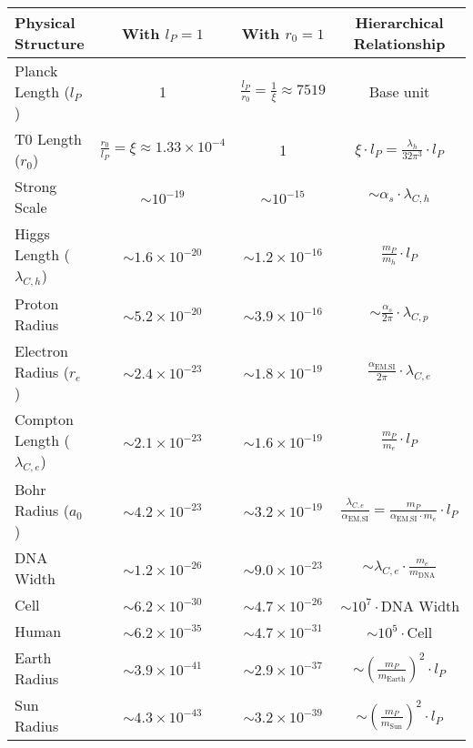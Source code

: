 \documentclass[12pt,a4paper]{article}
\newcommand{\alphaEMSI}{\alpha_{\text{EM,SI}}}
\begin{document}
	\begin{table}[H]
		\centering
		\begin{adjustbox}{width=\textwidth}
			\begin{tabular}{lccc}
				\toprule
				\textbf{Physical Structure} & \textbf{With \(l_P = 1\)} & \textbf{With \(r_0 = 1\)} & \textbf{Hierarchical Relationship} \\
				\midrule
				Planck Length (\(l_P\)) & 1 & \(\frac{l_P}{r_0} = \frac{1}{\xi} \approx 7519\) & Base unit \\
				T0 Length (\(r_0\)) & \(\frac{r_0}{l_P} = \xi \approx 1.33 \times 10^{-4}\) & 1 & \(\xi \cdot l_P = \frac{\lambda_h}{32\pi^3} \cdot l_P\) \\
				Strong Scale & \(\sim 10^{-19}\) & \(\sim 10^{-15}\) & \(\sim \alpha_s \cdot \lambda_{C,h}\) \\
				Higgs Length (\(\lambda_{C,h}\)) & \(\sim 1.6 \times 10^{-20}\) & \(\sim 1.2 \times 10^{-16}\) & \(\frac{m_P}{m_h} \cdot l_P\) \\
				Proton Radius & \(\sim 5.2 \times 10^{-20}\) & \(\sim 3.9 \times 10^{-16}\) & \(\sim \frac{\alpha_s}{2\pi} \cdot \lambda_{C,p}\) \\
				Electron Radius (\(r_e\)) & \(\sim 2.4 \times 10^{-23}\) & \(\sim 1.8 \times 10^{-19}\) & \(\frac{\alphaEMSI}{2\pi} \cdot \lambda_{C,e}\) \\
				Compton Length (\(\lambda_{C,e}\)) & \(\sim 2.1 \times 10^{-23}\) & \(\sim 1.6 \times 10^{-19}\) & \(\frac{m_P}{m_e} \cdot l_P\) \\
				Bohr Radius (\(a_0\)) & \(\sim 4.2 \times 10^{-23}\) & \(\sim 3.2 \times 10^{-19}\) & \(\frac{\lambda_{C,e}}{\alphaEMSI} = \frac{m_P}{\alphaEMSI \cdot m_e} \cdot l_P\) \\
				DNA Width & \(\sim 1.2 \times 10^{-26}\) & \(\sim 9.0 \times 10^{-23}\) & \(\sim \lambda_{C,e} \cdot \frac{m_e}{m_{\mathrm{DNA}}}\) \\
				Cell & \(\sim 6.2 \times 10^{-30}\) & \(\sim 4.7 \times 10^{-26}\) & \(\sim 10^7 \cdot \text{DNA Width}\) \\
				Human & \(\sim 6.2 \times 10^{-35}\) & \(\sim 4.7 \times 10^{-31}\) & \(\sim 10^5 \cdot \text{Cell}\) \\
				Earth Radius & \(\sim 3.9 \times 10^{-41}\) & \(\sim 2.9 \times 10^{-37}\) & \(\sim \left(\frac{m_P}{m_{\mathrm{Earth}}}\right)^2 \cdot l_P\) \\
				Sun Radius & \(\sim 4.3 \times 10^{-43}\) & \(\sim 3.2 \times 10^{-39}\) & \(\sim \left(\frac{m_P}{m_{\mathrm{Sun}}}\right)^2 \cdot l_P\) \\

\end{tabular}
\end{adjustbox}
\end{table}
\end{document}
